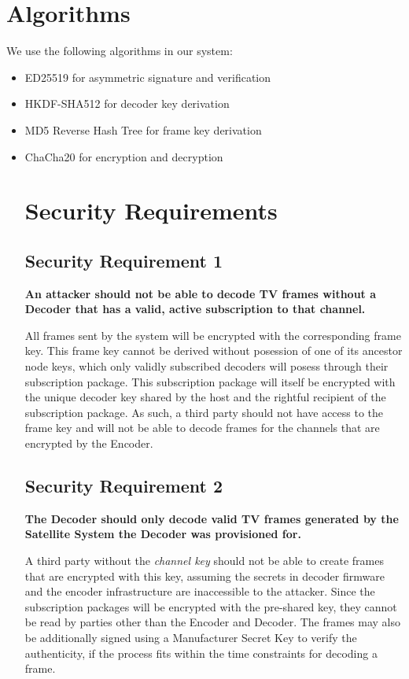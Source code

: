 \documentclass[12pt]{article}
\begin{document}
\section*{Algorithms}
We use the following algorithms in our system:
\begin{itemize}
  \item ED25519 for asymmetric signature and verification
  \item HKDF-SHA512 for decoder key derivation
  \item MD5 Reverse Hash Tree for frame key derivation
  \item ChaCha20 for encryption and decryption

\section*{Security Requirements}

\subsection*{Security Requirement 1}
\textbf{An attacker should not be able to decode TV frames without a Decoder that has a valid, active subscription to that channel.}

All frames sent by the system will be encrypted with the corresponding frame key. This frame key cannot be derived without posession of one of its ancestor node keys, which only validly subscribed decoders will posess through their subscription package. This subscription package will itself be encrypted with the unique decoder key shared by the host and the rightful recipient of the subscription package. As such, a third party should not have access to the frame key and will not be able to decode frames for the channels that are encrypted by the Encoder.

\subsection*{Security Requirement 2}
\textbf{The Decoder should only decode valid TV frames generated by the Satellite System the Decoder was provisioned for.}

A third party without the \textit{channel key} should not be able to create frames that are encrypted with this key, assuming the secrets in decoder firmware and the encoder infrastructure are inaccessible to the attacker. Since the subscription packages will be encrypted with the pre-shared key, they cannot be read by parties other than the Encoder and Decoder. The frames may also be additionally signed using a Manufacturer Secret Key to verify the authenticity, if the process fits within the time constraints for decoding a frame.


\end{itemize}
\end{document}
